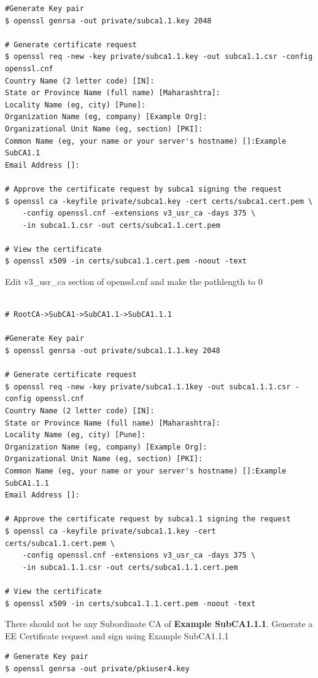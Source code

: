\documentclass[12pt]{report}
\begin{document}
\begin{enumerate}[label*=\arabic*.]
\begin{lstlisting}[style=bashInputStyle]
#Generate Key pair 
$ openssl genrsa -out private/subca1.1.key 2048

# Generate certificate request
$ openssl req -new -key private/subca1.1.key -out subca1.1.csr -config openssl.cnf
Country Name (2 letter code) [IN]:
State or Province Name (full name) [Maharashtra]:
Locality Name (eg, city) [Pune]:
Organization Name (eg, company) [Example Org]:
Organizational Unit Name (eg, section) [PKI]:
Common Name (eg, your name or your server's hostname) []:Example SubCA1.1
Email Address []:

# Approve the certificate request by subca1 signing the request
$ openssl ca -keyfile private/subca1.key -cert certs/subca1.cert.pem \
    -config openssl.cnf -extensions v3_usr_ca -days 375 \
    -in subca1.1.csr -out certs/subca1.1.cert.pem

# View the certificate 
$ openssl x509 -in certs/subca1.1.cert.pem -noout -text
        \end{lstlisting}
        Edit v3\_usr\_ca section of openssl.cnf and make the pathlength to 0
        \begin{lstlisting}[style=bashInputStyle]

# RootCA->SubCA1->SubCA1.1->SubCA1.1.1

#Generate Key pair 
$ openssl genrsa -out private/subca1.1.1.key 2048

# Generate certificate request
$ openssl req -new -key private/subca1.1.1key -out subca1.1.1.csr -config openssl.cnf
Country Name (2 letter code) [IN]:
State or Province Name (full name) [Maharashtra]:
Locality Name (eg, city) [Pune]:
Organization Name (eg, company) [Example Org]:
Organizational Unit Name (eg, section) [PKI]:
Common Name (eg, your name or your server's hostname) []:Example SubCA1.1.1
Email Address []:

# Approve the certificate request by subca1.1 signing the request
$ openssl ca -keyfile private/subca1.1.key -cert certs/subca1.1.cert.pem \
    -config openssl.cnf -extensions v3_usr_ca -days 375 \
    -in subca1.1.1.csr -out certs/subca1.1.1.cert.pem

# View the certificate 
$ openssl x509 -in certs/subca1.1.1.cert.pem -noout -text
        \end{lstlisting}
        There should not be any Subordinate CA of \textbf{Example SubCA1.1.1}. Generate 
        a EE Certificate request and sign using Example SubCA1.1.1
        \begin{lstlisting}[style=bashInputStyle]
# Generate Key pair
$ openssl genrsa -out private/pkiuser4.key


\end{lstlisting}
\end{enumerate}
\end{document}
